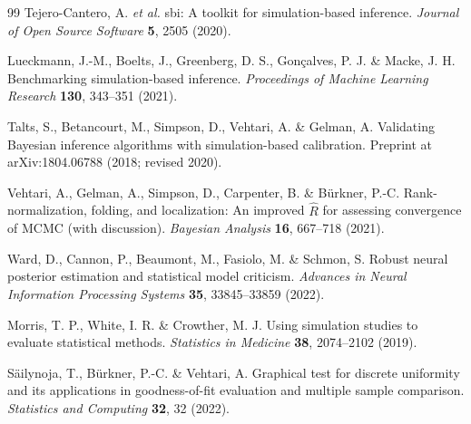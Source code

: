 \begin{thebibliography}{99}
Tejero-Cantero, A. \textit{et al.} sbi: A toolkit for simulation-based inference.
\textit{Journal of Open Source Software} \textbf{5}, 2505 (2020).

Lueckmann, J.-M., Boelts, J., Greenberg, D. S., Gon{\c c}alves, P. J.
\& Macke, J. H. Benchmarking simulation-based inference.
\textit{Proceedings of Machine Learning Research} \textbf{130},
343--351 (2021).

Talts, S., Betancourt, M., Simpson, D., Vehtari, A. \& Gelman, A.
Validating Bayesian inference algorithms with simulation-based calibration.
Preprint at arXiv:1804.06788 (2018; revised 2020).

Vehtari, A., Gelman, A., Simpson, D., Carpenter, B. \& B{\"u}rkner, P.-C.
Rank-normalization, folding, and localization: An improved $\widehat{R}$ for
assessing convergence of MCMC (with discussion).
\textit{Bayesian Analysis} \textbf{16}, 667--718 (2021).

Ward, D., Cannon, P., Beaumont, M., Fasiolo, M. \& Schmon, S.
Robust neural posterior estimation and statistical model criticism.
\textit{Advances in Neural Information Processing Systems} \textbf{35},
33845--33859 (2022).

Morris, T. P., White, I. R. \& Crowther, M. J. Using simulation studies to
evaluate statistical methods. \textit{Statistics in Medicine}
\textbf{38}, 2074--2102 (2019).

S{\"a}ilynoja, T., B{\"u}rkner, P.-C. \& Vehtari, A.
Graphical test for discrete uniformity and its applications in goodness-of-fit
evaluation and multiple sample comparison.
\textit{Statistics and Computing} \textbf{32}, 32 (2022).

\end{thebibliography}
